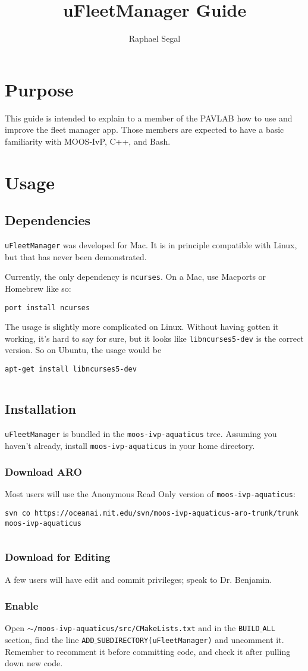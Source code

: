 \documentclass[11pt]{article}
\author{Raphael Segal}
\title{uFleetManager Guide}
\newcommand{\cmdline}[1]{\vspace{.2em} $\:$\\ \begin{minipage}{\dimexpr\textwidth-2cm}
\texttt{#1}
\end{minipage} $\:$\\ \vspace{-.2em} }
\begin{document}
\maketitle
\section{Purpose}
This guide is intended to explain to a member of the PAVLAB how to use and improve the fleet manager app. Those members are expected to have a basic familiarity with MOOS-IvP, C++, and Bash.
\section{Usage}
\subsection{Dependencies}
\texttt{uFleetManager} was developed for Mac. It is in principle compatible with Linux, but that has never been demonstrated.

Currently, the only dependency is \texttt{ncurses}. On a Mac, use Macports or Homebrew like so:
\cmdline{port install ncurses}
The usage is slightly more complicated on Linux. Without having gotten it working, it's hard to say for sure, but it looks like \texttt{libncurses5-dev} is the correct version. So on Ubuntu, the usage would be
\cmdline{apt-get install libncurses5-dev}
\subsection{Installation}
\texttt{uFleetManager} is bundled in the \texttt{moos-ivp-aquaticus} tree. Assuming you haven't already, install \texttt{moos-ivp-aquaticus} in your home directory.
\subsubsection{Download ARO}
Most users will use the Anonymous Read Only version of \texttt{moos-ivp-aquaticus}: 
\cmdline{svn co https://oceanai.mit.edu/svn/moos-ivp-aquaticus-aro-trunk/trunk moos-ivp-aquaticus}
\subsubsection{Download for Editing}
A few users will have edit and commit privileges; speak to Dr. Benjamin.
\subsubsection{Enable}
Open \texttt{$\sim$/moos-ivp-aquaticus/src/CMakeLists.txt} and in the \texttt{BUILD$\_$ALL} section, find the line \texttt{ADD$\_$SUBDIRECTORY(uFleetManager)} and uncomment it. Remember to recomment it before committing code, and check it after pulling down new code.
\end{document}
